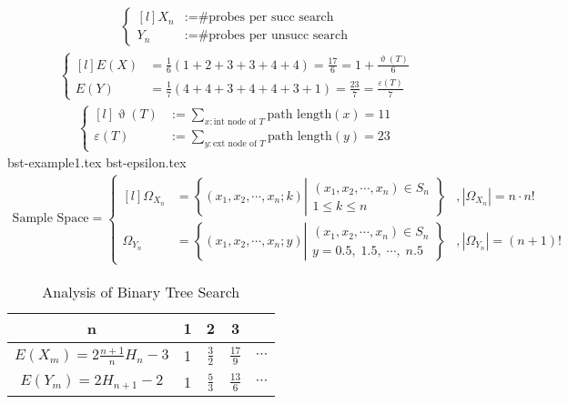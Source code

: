 \documentclass[12pt,a4paper,oneside]{report}
\begin{document}
\begin{align*}
	\left\{\begin{matrix*}[l]
		X_n &:= \text{\# probes per succ search} \\
		Y_n &:= \text{\# probes per unsucc search}
	\end{matrix*}\right.
\end{align*}
\begin{align*}
	\left\{\begin{matrix*}[l]
		E(X) &= \frac{1}{6} \left(1+2+3+3+4+4\right) = \frac{17}{6} = 1 + \frac{\upvartheta(T)}{6} \\
		E(Y) &= \frac{1}{7} \left(4+4+3+4+4+3+1\right) = \frac{23}{7} = \frac{\varepsilon(T)}{7}
	\end{matrix*}\right.
\end{align*}
\begin{align*}
	\left\{\begin{matrix*}[l]
		\upvartheta(T) &:= \sum_{x : \text{int node of } T} \text{path length}(x) = 11\\
		\varepsilon(T) &:= \sum_{y : \text{ext node of } T} \text{path length}(y) = 23
	\end{matrix*}\right.
\end{align*}
{bst-example1.tex}
{bst-epsilon.tex}
\begin{align*}
	\text{Sample Space} = \left\{\begin{matrix*}[l]
		\Omega_{X_n} &= \left\{(x_1, x_2, \cdots, x_n; k) 
			\left|\begin{matrix}
				(x_1, x_2, \cdots, x_n) \in S_n \\ 
				1 \le k \le n
			\end{matrix}\right. 
		\right\} &, |\Omega_{X_n}| = n \cdot n! \\
		\Omega_{Y_n} &= \left\{(x_1, x_2, \cdots, x_n; y)
	   		\left|\begin{matrix}	
				(x_1, x_2, \cdots, x_n) \in S_n \\
				y = 0.5, \; 1.5, \; \cdots, \; n.5
			\end{matrix}\right.
		\right\} &, |\Omega_{Y_n}| = (n+1)!
	\end{matrix*}\right. 
\end{align*}

\begin{table}[]
	\centering
	\caption{Analysis of Binary Tree Search}
	\label{bst}
	\begin{tabular}{|c | c | c | c | c|}
		\hline
		n & 1 & 2 & 3 &
		\\ \hline
		$E(X_m) = 2 \frac{n+1}{n} H_n - 3$ & 1 & $\frac{3}{2}$ & $\frac{17}{9}$ & $\cdots$ 
		\\ \hline
		$E(Y_m) = 2 H_{n+1} - 2$ & 1 & $\frac{5}{3}$ & $\frac{13}{6}$ & $\cdots$ 
		\\ \hline
	\end{tabular}
\end{table}
\end{document}
